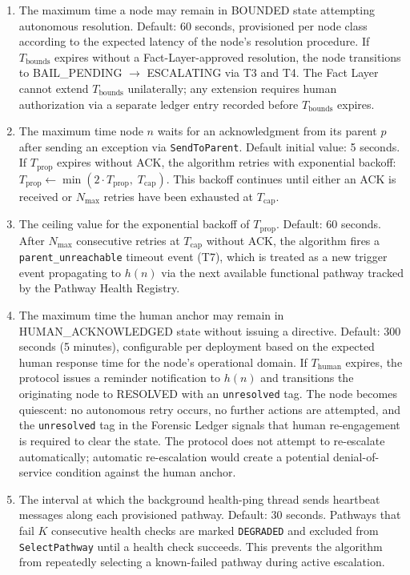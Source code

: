 \begin{enumerate}
\item[\textbf{$T_{\text{bounds}}$ — Bounds Engine resolution timeout.}] The maximum time a node may remain in BOUNDED state attempting autonomous resolution. Default: 60 seconds, provisioned per node class according to the expected latency of the node's resolution procedure. If $T_{\text{bounds}}$ expires without a Fact-Layer-approved resolution, the node transitions to BAIL\_PENDING $\rightarrow$ ESCALATING via T3 and T4. The Fact Layer cannot extend $T_{\text{bounds}}$ unilaterally; any extension requires human authorization via a separate ledger entry recorded before $T_{\text{bounds}}$ expires.

\item[\textbf{$T_{\text{prop}}$ — Per-hop propagation timeout.}] The maximum time node $n$ waits for an acknowledgment from its parent $p$ after sending an exception via \texttt{SendToParent}. Default initial value: 5 seconds. If $T_{\text{prop}}$ expires without ACK, the algorithm retries with exponential backoff: $T_{\text{prop}} \leftarrow \min(2 \cdot T_{\text{prop}},\; T_{\text{cap}})$. This backoff continues until either an ACK is received or $N_{\max}$ retries have been exhausted at $T_{\text{cap}}$.

\item[\textbf{$T_{\text{cap}}$ — Maximum propagation timeout value.}] The ceiling value for the exponential backoff of $T_{\text{prop}}$. Default: 60 seconds. After $N_{\max}$ consecutive retries at $T_{\text{cap}}$ without ACK, the algorithm fires a \texttt{parent\_unreachable} timeout event (T7), which is treated as a new trigger event propagating to $h(n)$ via the next available functional pathway tracked by the Pathway Health Registry.

\item[\textbf{$T_{\text{human}}$ — Human acknowledgment timeout.}] The maximum time the human anchor may remain in HUMAN\_ACKNOWLEDGED state without issuing a directive. Default: 300 seconds (5 minutes), configurable per deployment based on the expected human response time for the node's operational domain. If $T_{\text{human}}$ expires, the protocol issues a reminder notification to $h(n)$ and transitions the originating node to RESOLVED with an \texttt{unresolved} tag. The node becomes quiescent: no autonomous retry occurs, no further actions are attempted, and the \texttt{unresolved} tag in the Forensic Ledger signals that human re-engagement is required to clear the state. The protocol does not attempt to re-escalate automatically; automatic re-escalation would create a potential denial-of-service condition against the human anchor.

\item[\textbf{$T_{\text{health}}$ — Pathway health-check interval.}] The interval at which the background health-ping thread sends heartbeat messages along each provisioned pathway. Default: 30 seconds. Pathways that fail $K$ consecutive health checks are marked \texttt{DEGRADED} and excluded from \texttt{SelectPathway} until a health check succeeds. This prevents the algorithm from repeatedly selecting a known-failed pathway during active escalation.
\end{enumerate}

